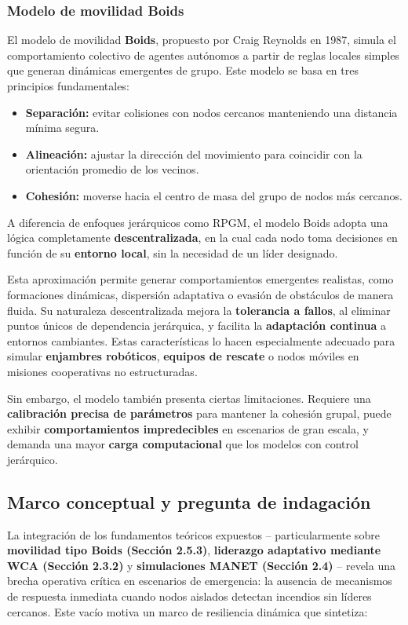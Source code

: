 \documentclass{article}
\begin{document}
\subsubsection{Modelo de movilidad Boids}

El modelo de movilidad \textbf{Boids}, propuesto por Craig Reynolds en 1987, simula el comportamiento colectivo de agentes autónomos a partir de reglas locales simples que generan dinámicas emergentes de grupo. Este modelo se basa en tres principios fundamentales:

\begin{itemize}
    \item \textbf{Separación:} evitar colisiones con nodos cercanos manteniendo una distancia mínima segura.
    \item \textbf{Alineación:} ajustar la dirección del movimiento para coincidir con la orientación promedio de los vecinos.
    \item \textbf{Cohesión:} moverse hacia el centro de masa del grupo de nodos más cercanos.
\end{itemize}

A diferencia de enfoques jerárquicos como RPGM, el modelo Boids adopta una lógica completamente \textbf{descentralizada}, en la cual cada nodo toma decisiones en función de su \textbf{entorno local}, sin la necesidad de un líder designado.

Esta aproximación permite generar comportamientos emergentes realistas, como formaciones dinámicas, dispersión adaptativa o evasión de obstáculos de manera fluida. Su naturaleza descentralizada mejora la \textbf{tolerancia a fallos}, al eliminar puntos únicos de dependencia jerárquica, y facilita la \textbf{adaptación continua} a entornos cambiantes. Estas características lo hacen especialmente adecuado para simular \textbf{enjambres robóticos}, \textbf{equipos de rescate} o nodos móviles en misiones cooperativas no estructuradas.

Sin embargo, el modelo también presenta ciertas limitaciones. Requiere una \textbf{calibración precisa de parámetros} para mantener la cohesión grupal, puede exhibir \textbf{comportamientos impredecibles} en escenarios de gran escala, y demanda una mayor \textbf{carga computacional} que los modelos con control jerárquico. 



\subsection{Marco conceptual y pregunta de indagación}
La integración de los fundamentos teóricos expuestos – particularmente sobre \textbf{movilidad tipo Boids (Sección 2.5.3)}, \textbf{liderazgo adaptativo mediante WCA (Sección 2.3.2)} y \textbf{simulaciones MANET (Sección 2.4)} – revela una brecha operativa crítica en escenarios de emergencia: la ausencia de mecanismos de respuesta inmediata cuando nodos aislados detectan incendios sin líderes cercanos. Este vacío motiva un marco de resiliencia dinámica que sintetiza:
\end{document}

